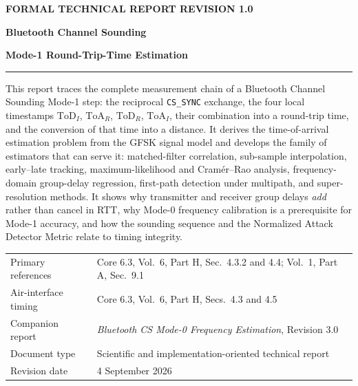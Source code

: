 \documentclass[11pt,a4paper]{article}
\newcommand{\ToD}{\mathrm{ToD}}
\newcommand{\ToA}{\mathrm{ToA}}
\newcommand{\code}[1]{\texttt{\small #1}}
\begin{document}
\thispagestyle{empty}
\vspace*{18mm}
{\color{accent}\small\bfseries FORMAL TECHNICAL REPORT \hfill REVISION 1.0}

\vspace{26mm}
{\raggedright\color{navy}\Huge\bfseries Bluetooth Channel Sounding\par}
\vspace{5mm}
{\raggedright\color{navy}\huge\bfseries Mode-1 Round-Trip-Time Estimation\par}

\vspace{7mm}

\vspace{12mm}
\noindent\rule{\textwidth}{1pt}

\vspace{4mm}
\noindent
This report traces the complete measurement chain of a Bluetooth Channel Sounding Mode-1
step: the reciprocal \code{CS\_SYNC} exchange, the four local timestamps
$\ToD_I$, $\ToA_R$, $\ToD_R$, $\ToA_I$, their combination into a round-trip time, and the
conversion of that time into a distance. It derives the time-of-arrival estimation problem
from the GFSK signal model and develops the family of estimators that can serve it:
matched-filter correlation, sub-sample interpolation, early--late tracking, maximum-likelihood
and Cram\'er--Rao analysis, frequency-domain group-delay regression, first-path detection under
multipath, and super-resolution methods. It shows why transmitter and receiver group delays
\emph{add} rather than cancel in RTT, why Mode-0 frequency calibration is a prerequisite for
Mode-1 accuracy, and how the sounding sequence and the Normalized Attack Detector Metric relate
to timing integrity.

\vfill
\noindent
\begin{tabular}{@{}L{40mm}L{95mm}@{}}
Primary references & Core 6.3, Vol.\ 6, Part H, Sec.\ 4.3.2 and 4.4; Vol.\ 1, Part A, Sec.\ 9.1 \\
Air-interface timing & Core 6.3, Vol.\ 6, Part H, Secs.\ 4.3 and 4.5 \\
Companion report & \emph{Bluetooth CS Mode-0 Frequency Estimation}, Revision 3.0 \\
Document type & Scientific and implementation-oriented technical report \\
Revision date & 4 September 2026 \\
\end{tabular}
\end{document}
